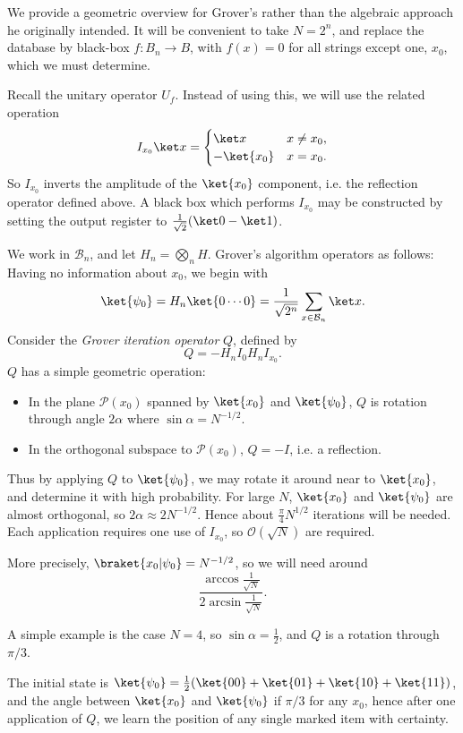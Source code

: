 \documentclass[12pt]{article}
\begin{document}
We provide a geometric overview for Grover's rather than the algebraic approach he originally intended. It will be convenient to take $N = 2^n$, and replace the database by black-box $f : B_n \to B$, with $f(x) = 0$ for all strings except one, $x_0$, which we must determine.

Recall the unitary operator $U_f$. Instead of using this, we will use the related operation
\[
I_{x_0} \ket x =
\begin{cases}
	\ket x & x \neq x_0, \\
	- \ket {x_0} & x = x_0.
\end{cases}
\]
So $I_{x_0}$ inverts the amplitude of the $\ket{x_0}$ component, i.e. the reflection operator defined above. A black box which performs $I_{x_0}$ may be constructed by setting the output register to $\frac{1}{\sqrt 2}(\ket 0 - \ket 1)$.

We work in $\mathcal{B}_n$, and let $H_n = \bigotimes_n H$. Grover's algorithm operators as follows: Having no information about $x_0$, we begin with
\[
	\ket{\psi_0} = H_n \ket{0 \cdots 0} = \frac{1}{\sqrt{2^n}} \sum_{x \in \mathcal{B}_n} \ket x.
\]
Consider the \emph{Grover iteration operator} $Q$, defined by
\[
Q = - H_n I_0 H_n I_{x_0}.
\]
$Q$ has a simple geometric operation:
\begin{itemize}
	\item In the plane $\mathcal{P}(x_0)$ spanned by $\ket{x_0}$ and $\ket{\psi_0}$, $Q$ is rotation through angle $2 \alpha$ where $\sin \alpha = N^{-1/2}$.
	\item In the orthogonal subspace to $\mathcal{P}(x_0)$, $Q = -I$, i.e. a reflection.
\end{itemize}

Thus by applying $Q$ to $\ket{\psi_0}$, we may rotate it around near to $\ket{x_0}$, and determine it with high probability. For large $N$, $\ket{x_0}$ and $\ket{\psi_0}$ are almost orthogonal, so $2\alpha \approx 2N^{-1/2}$. Hence about $\frac{\pi}{4} N^{1/2}$ iterations will be needed. Each application requires one use of $I_{x_0}$, so $\mathcal{O}(\sqrt N)$ are required.

More precisely, $\braket{x_0|\psi_0} = N^{-1/2}$, so we will need around
\[
\frac{\arccos \frac{1}{\sqrt N}}{2 \arcsin \frac{1}{\sqrt N}}.
\]

\begin{exbox}
	A simple example is the case $N = 4$, so $\sin \alpha = \frac{1}{2}$, and $Q$ is a rotation through $\pi/3$.

	The initial state is $\ket{\psi_0} = \frac{1}{2}(\ket{00} + \ket{01} + \ket{10} + \ket{11})$, and the angle between $\ket{x_0}$ and $\ket{\psi_0}$ if $\pi/3$ for any $x_0$, hence after one application of $Q$, we learn the position of any single marked item with certainty.
\end{exbox}

\newpage

\printindex
\end{document}
